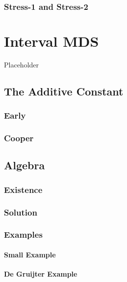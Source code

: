 \documentclass[
  12pt,
]{book}
\begin{document}
\subsection{Stress-1 and Stress-2}\label{stress-1-and-stress-2}

\chapter{Interval MDS}\label{intinterval}

Placeholder

\section{The Additive Constant}\label{intadditive}

\subsection{Early}\label{early}

\subsection{Cooper}\label{cooper}

\section{Algebra}\label{exactad}

\subsection{Existence}\label{existence}

\subsection{Solution}\label{solution}

\subsection{Examples}\label{examples}

\subsubsection{Small Example}\label{small-example}

\subsubsection{De Gruijter Example}\label{de-gruijter-example}
\end{document}
